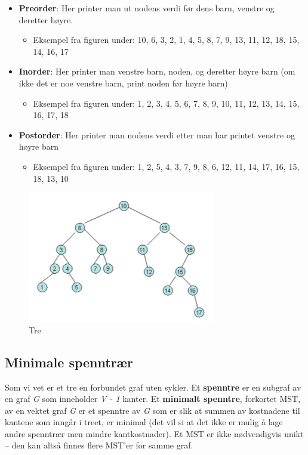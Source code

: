 \begin{boxed}
\begin{itemize}
    \item \textbf{Preorder}: Her printer man ut nodens verdi før dens barn, venstre og deretter høyre. 
    \begin{itemize}
        \item Eksempel fra figuren under: 10, 6, 3, 2, 1, 4, 5, 8, 7, 9, 13, 11, 12, 18, 15, 14, 16, 17
    \end{itemize}
    \item \textbf{Inorder}: Her printer man venstre barn, noden, og deretter høyre barn (om ikke det er noe venstre barn, print noden før høyre barn)
    \begin{itemize}
        \item Eksempel fra figuren under: 1, 2, 3, 4, 5, 6, 7, 8, 9, 10, 11, 12, 13, 14, 15, 16, 17, 18
    \end{itemize}
    \item \textbf{Postorder}: Her printer man nodens verdi etter man har printet venstre og høyre barn
    \begin{itemize}
        \item Eksempel fra figuren under: 1, 2, 5, 4, 3, 7, 9, 8, 6, 12, 11, 14, 17, 16, 15, 18, 13, 10
    \end{itemize}
\end{itemize}

\begin{figure}[H]
\includegraphics[scale=0.8]{images/tregraf}
\centering %
\caption{Tre}
\label{fig:tregraf}
\end{figure}
\end{boxed}

\subsection{Minimale spenntrær}
Som vi vet er et tre en forbundet graf uten sykler. Et \textbf{spenntre} er en subgraf av en graf \textit{G} som inneholder \textit{V - 1} kanter. Et \textbf{minimalt spenntre}, forkortet MST, av en vektet graf \textit{G} er et spenntre av \textit{G} som er slik at summen av kostnadene til kantene som inngår i treet, er minimal (det vil si at det ikke er mulig å lage andre spenntrær men mindre kantkostnader). Et MST er ikke nødvendigvis unikt – den kan altså finnes flere MST'er for samme graf.

